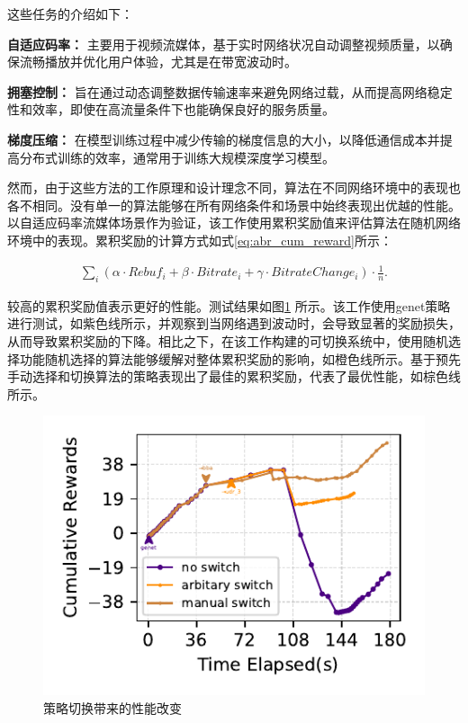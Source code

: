 

这些任务的介绍如下：

\textbf{自适应码率：} 主要用于视频流媒体，基于实时网络状况自动调整视频质量，以确保流畅播放并优化用户体验，尤其是在带宽波动时。

\textbf{拥塞控制：} 旨在通过动态调整数据传输速率来避免网络过载，从而提高网络稳定性和效率，即使在高流量条件下也能确保良好的服务质量。

\textbf{梯度压缩：} 在模型训练过程中减少传输的梯度信息的大小，以降低通信成本并提高分布式训练的效率，通常用于训练大规模深度学习模型。

然而，由于这些方法的工作原理和设计理念不同，算法在不同网络环境中的表现也各不相同。没有单一的算法能够在所有网络条件和场景中始终表现出优越的性能。以自适应码率流媒体场景作为验证，该工作使用累积奖励值来评估算法在随机网络环境中的表现。累积奖励的计算方式如式\eqref{eq:abr_cum_reward}所示：

\begin{equation}
\begin{aligned}
    \sum_i(\alpha \cdot Rebuf_i + \beta \cdot Bitrate_i + \gamma \cdot BitrateChange_i) \cdot \frac{1}{n}.
\end{aligned}
\label{eq:abr_cum_reward}
\end{equation}

较高的累积奖励值表示更好的性能。测试结果如图\ref{fig_manual_switch} 所示。该工作使用genet策略进行测试，如紫色线所示，并观察到当网络遇到波动时，会导致显著的奖励损失，从而导致累积奖励的下降。相比之下，在该工作构建的可切换系统中，使用随机选择功能随机选择的算法能够缓解对整体累积奖励的影响，如橙色线所示。基于预先手动选择和切换算法的策略表现出了最佳的累积奖励，代表了最优性能，如棕色线所示。

\begin{figure} [h!]
\centering
\includegraphics[width=0.5\linewidth]{figures/chap04/manual_switch_validation.pdf} 
\caption{策略切换带来的性能改变}
\label{fig_manual_switch}
\end{figure}



